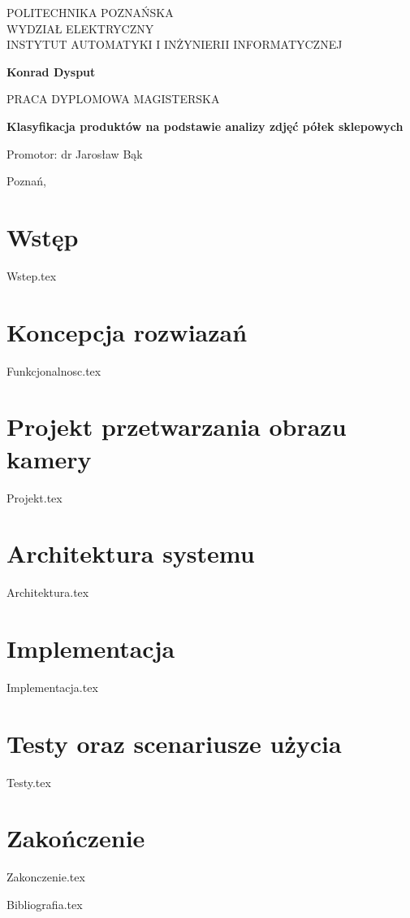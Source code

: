 \documentclass[12pt,a4paper,leqno,oneside,titlepage]{mwrep}
\begin{document}
\begin{titlepage}
\begin{center}
{\large POLITECHNIKA POZNAŃSKA\\ WYDZIAŁ ELEKTRYCZNY\\ INSTYTUT AUTOMATYKI I INŻYNIERII INFORMATYCZNEJ\par}
\end{center}
\vspace{1.5cm plus 1fill}
\begin{center}
{\bf \Large Konrad Dysput\par}
\end{center}
\vspace{1.5cm plus 1mm minus 2mm}
\begin{center}
{\large PRACA DYPLOMOWA MAGISTERSKA\par}
\end{center}
\vspace{1.5cm plus 1mm minus 2mm}
\begin{center}
{\huge\textbf{Klasyfikacja produktów na podstawie analizy zdjęć półek sklepowych }\par}
\vspace{1.5cm plus 1.5fill}
\begin{flushright}
{\large Promotor: dr Jarosław Bąk}
\end{flushright}
\vspace{4cm plus .1fill}
{\large Poznań,\par}
\end{center}
\end{titlepage}

\tableofcontents

\chapter{Wstęp}
{Wstep.tex}

\chapter{Koncepcja rozwiazań}
{Funkcjonalnosc.tex}

\chapter{Projekt przetwarzania obrazu kamery}
{Projekt.tex}

\chapter{Architektura systemu}
{Architektura.tex}

\chapter{Implementacja}
{Implementacja.tex}

\chapter{Testy oraz scenariusze użycia}
{Testy.tex}

\chapter{Zakończenie}
{Zakonczenie.tex}

{Bibliografia.tex}
\end{document}
